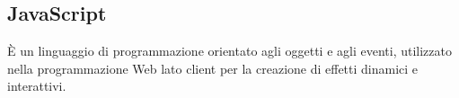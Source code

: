 \section{}
\subsection*{JavaScript} È un linguaggio di programmazione orientato agli oggetti e agli eventi, utilizzato nella programmazione Web lato client per la creazione di effetti dinamici e interattivi.